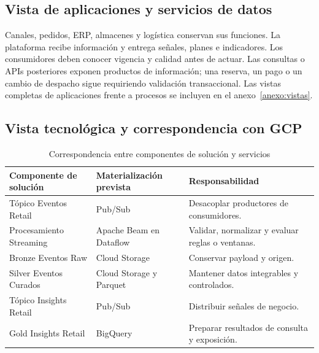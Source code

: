 \documentclass[11pt,a4paper]{article}
\begin{document}
\subsection{Vista de aplicaciones y servicios de datos}
Canales, pedidos, ERP, almacenes y logística conservan sus funciones. La plataforma recibe información y entrega señales, planes e indicadores. Los consumidores deben conocer vigencia y calidad antes de actuar. Las consultas o APIs posteriores exponen productos de información; una reserva, un pago o un cambio de despacho sigue requiriendo validación transaccional. Las vistas completas de aplicaciones frente a procesos se incluyen en el anexo~\ref{anexo:vistas}.

\subsection{Vista tecnológica y correspondencia con GCP}
\begin{table}[H]
\caption{Correspondencia entre componentes de solución y servicios}\label{tab:componentes}
\small\begin{tabularx}{\linewidth}{@{}P{.32\linewidth}YY@{}}\toprule
Componente de solución & Materialización prevista & Responsabilidad\\\midrule
Tópico Eventos Retail & Pub/Sub & Desacoplar productores de consumidores.\\
Procesamiento Streaming & Apache Beam en Dataflow & Validar, normalizar y evaluar reglas o ventanas.\\
Bronze Eventos Raw & Cloud Storage & Conservar payload y origen.\\
Silver Eventos Curados & Cloud Storage y Parquet & Mantener datos integrables y controlados.\\
Tópico Insights Retail & Pub/Sub & Distribuir señales de negocio.\\
Gold Insights Retail & BigQuery & Preparar resultados de consulta y exposición.\\\bottomrule
\end{tabularx}
\end{table}
\end{document}
